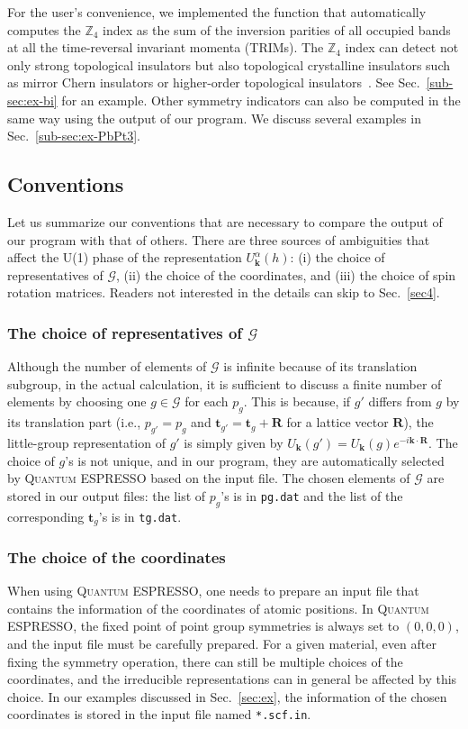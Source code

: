\documentclass[3p,preprint]{elsarticle}
\newcommand{\mZ}{\mathbb{Z}}
\newcommand{\calG}{\mathcal{G}}
\newcommand{\vk}{\bm{k}}
\begin{document}
For the user's convenience, we implemented the function that automatically computes the $\mZ_4$ index as the sum of the inversion parities of all occupied bands at all the time-reversal invariant momenta (TRIMs).
The $\mZ_4$ index can detect not only strong topological insulators but also topological crystalline insulators such as mirror Chern insulators or higher-order topological insulators~\cite{PhysRevX.8.031070, QuantitativeMappings}.  See Sec.~\ref{sub-sec:ex-bi} for an example.  
Other symmetry indicators can also be computed in the same way using the output of our program.  We discuss several examples in Sec.~\ref{sub-sec:ex-PbPt3}.

\subsection{Conventions}
\label{sec3}
Let us summarize our conventions that are necessary to compare the output of our program with that of others. 
There are three sources of ambiguities that affect the U(1) phase of the representation $U_{\vk}^{\alpha}(h)$: (i) the choice of representatives of $\mathcal{G}$, (ii) the choice of the coordinates, and (iii) the choice of spin rotation matrices. 
Readers not interested in the details can skip to Sec.~\ref{sec4}. 

\subsubsection{The choice of representatives of $\mathcal{G}$}
Although the number of elements of $\calG$ is infinite because of its translation subgroup, in the actual calculation, 
it is sufficient to discuss a finite number of elements by choosing one $g\in\calG$ for each $p_g$. 
This is because, if $g'$ differs from $g$ by its translation part (i.e., $p_{g'}=p_g$ and $\bm{t}_{g'}=\bm{t}_g+\bm{R}$ for a lattice vector $\bm{R}$), the little-group representation of $g'$ is simply given by $U_{\bm{k}}(g')=U_{\bm{k}}(g)e^{-i\bm{k}\cdot\bm{R}}$.
The choice of $g$'s is not unique, and in our program, they are automatically selected by \textsc{Quantum ESPRESSO} based on the input file.
The chosen elements of $\calG$ are stored in our output files: 
the list of $p_g$'s is in \texttt{pg.dat} and the list of the corresponding $\bm{t}_g$'s is in \texttt{tg.dat}.

\subsubsection{The choice of the coordinates}
When using \textsc{Quantum ESPRESSO}, one needs to prepare an input file that contains the information of the coordinates of atomic positions.
In \textsc{Quantum ESPRESSO}, the fixed point of point group symmetries is always set to $(0,0,0)$, and the input file must be carefully prepared.
For a given material, even after fixing the symmetry operation, there can still be multiple choices of the coordinates, and the irreducible representations can in general be affected by this choice.  
In our examples discussed in Sec.~\ref{sec:ex}, the information of the chosen coordinates is stored in the input file named \texttt{*.scf.in}.  
\end{document}
